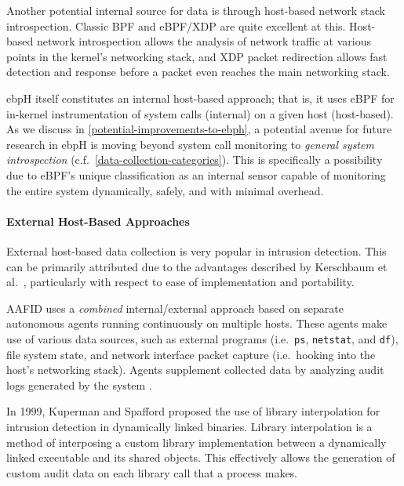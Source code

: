 \documentclass[
  12pt]{findlay}
\newcommand{\passthrough}[1]{#1}
\begin{document}
Another potential internal source for data is through host-based network
stack introspection. Classic BPF \autocite{bpf} and eBPF/XDP
\autocite{starovoitov13,bcc,xdp} are quite excellent at this. Host-based
network introspection allows the analysis of network traffic at various
points in the kernel's networking stack, and XDP packet redirection
\autocite{xdp} allows fast detection and response before a packet even
reaches the main networking stack.

ebpH itself constitutes an internal host-based approach; that is, it
uses eBPF for in-kernel instrumentation of system calls (internal) on a
given host (host-based). As we discuss in
\autoref{potential-improvements-to-ebph}, a potential avenue for future
research in ebpH is moving beyond system call monitoring to
\emph{general system introspection}
(c.f.~\autoref{data-collection-categories}). This is specifically a
possibility due to eBPF's unique classification as an internal sensor
capable of monitoring the entire system dynamically, safely, and with
minimal overhead.

\hypertarget{external-host-based-approaches}{%
\paragraph{External Host-Based
Approaches}\label{external-host-based-approaches}}

External host-based data collection is very popular in intrusion
detection. This can be primarily attributed due to the advantages
described by Kerschbaum et al.~\autocite{spafford02}, particularly with
respect to ease of implementation and portability.

AAFID \autocite{spafford00} uses a \emph{combined} internal/external
approach based on separate autonomous agents running continuously on
multiple hosts. These agents make use of various data sources, such as
external programs (i.e.~\passthrough{\lstinline!ps!},
\passthrough{\lstinline!netstat!}, and \passthrough{\lstinline!df!}),
file system state, and network interface packet capture (i.e.~hooking
into the host's networking stack). Agents supplement collected data by
analyzing audit logs generated by the system \autocite{spafford02}.

In 1999, Kuperman and Spafford \autocite{kuperman99} proposed the use of
library interpolation for intrusion detection in dynamically linked
binaries. Library interpolation is a method of interposing a custom
library implementation between a dynamically linked executable and its
shared objects. This effectively allows the generation of custom audit
data on each library call that a process makes.
\end{document}
